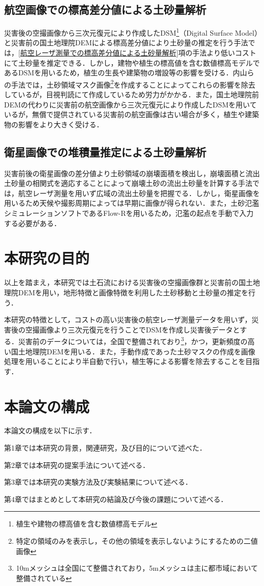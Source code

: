    \subsection*{航空画像での標高差分値による土砂量解析}
      災害後の空撮画像から三次元復元により作成したDSM\footnote{植生や建物の標高値を含む数値標高モデル}（Digital Surface Model）と災害前の国土地理院DEM\cite{基盤地図情報}による標高差分値により土砂量の推定を行う手法\cite{土砂量解析3}では，\ref{航空レーザ測量での標高差分値による土砂量解析}項の手法より低いコストにて土砂量を推定できる．しかし，建物や植生の標高値を含む数値標高モデルであるDSMを用いるため，植生の生長や建築物の増設等の影響を受ける．内山らの手法\cite{土砂量解析4}では，土砂領域マスク画像\footnote{特定の領域のみを表示し，その他の領域を表示しないようにするための二値画像}を作成することによってこれらの影響を除去しているが，目視判読にて作成しているため労力がかかる．また，国土地理院前DEMの代わりに災害前の航空画像から三次元復元により作成したDSMを用いているが，無償で提供されている災害前の航空画像は古い場合が多く，植生や建築物の影響をより大きく受ける．


    \subsection*{衛星画像での堆積量推定による土砂量解析}
      災害前後の衛星画像の差分値より土砂領域の崩壊面積を検出し，崩壊面積と流出土砂量の相関式を適応することによって崩壊土砂の流出土砂量を計算する手法\cite{土砂量解析5}では，航空レーザ測量を用いず広域の流出土砂量を把握でる．しかし，衛星画像を用いるため天候や撮影周期によっては早期に画像が得られない．また，土砂氾濫シミュレーションソフトであるFlow-R\cite{Flow-R}を用いるため，氾濫の起点を手動で入力する必要がある．



  \section{本研究の目的}
    以上を踏まえ，本研究では土石流における災害後の空撮画像群と災害前の国土地理院DEMを用い，地形特徴と画像特徴を利用した土砂移動と土砂量の推定を行う．
    
    本研究の特徴として，コストの高い災害後の航空レーザ測量データを用いず，災害後の空撮画像より三次元復元を行うことでDSMを作成し災害後データとする．災害前のデータについては，全国で整備されており\footnote{10mメッシュは全国にて整備されており，5mメッシュは主に都市域において整備されている}，かつ，更新頻度の高い国土地理院DEMを用いる．また，手動作成であった土砂マスクの作成を画像処理を用いることにより半自動で行い，植生等による影響を除去することを目指す．



  \section{本論文の構成}
    本論文の構成を以下に示す．
    
    第1章では本研究の背景，関連研究，及び目的について述べた．

    第2章では本研究の提案手法について述べる．

    第3章では本研究の実験方法及び実験結果について述べる．

    第4章ではまとめとして本研究の結論及び今後の課題について述べる．
